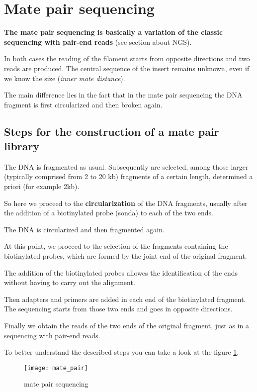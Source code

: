 \section{Mate pair sequencing}

\textbf{The mate pair sequencing is basically a variation of the classic
sequencing with pair-end reads} (see section about NGS).

In both cases the reading of the filament starts from opposite directions 
and two reads are produced. The central sequence of the insert remains unknown,
even if we know the size (\textit{inner mate distance}).

The main difference lies in the fact that in the mate pair sequencing the DNA
fragment is first circularized and then broken again.

\subsection{Steps for the construction of a mate pair library}

The DNA is fragmented as usual. Subsequently are selected, among those larger
(typically comprised from 2 to 20 kb) fragments of a certain length, determined
a priori (for example 2kb).

So here we proceed to the \textbf{circularization} of the DNA fragments,
usually after the addition of a biotinylated probe (sonda) to each of the two
ends.

The DNA is circularized and then fragmented again. 

At this point, we proceed to the selection of the fragments containing
the biotinylated probes, which are formed by the joint end of the
original fragment.

The addition of the biotinylated probes allowes the identification of the ends
without having to carry out the alignment.

Then adapters and primers are added in each end of the biotinylated
fragment. The sequencing starts from those two ends and goes in opposite
directions.

Finally we obtain the reads of the two ends of the original
fragment, just as in a sequencing with pair-end reads.

To better understand the described steps you can take a look at the figure
\ref{fig:mate_pair}.

\begin{figure}[H]
  \centering
  \texttt{[image: mate\_pair]}
  \caption{mate pair sequencing}
  \label{fig:mate_pair}
\end{figure}


